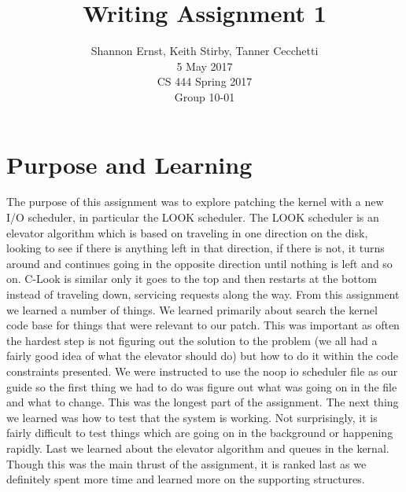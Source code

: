 \documentclass[letterpaper,10pt,serif,draftclsnofoot,onecolumn,compsoc,titlepage]{IEEEtran}
\title{Writing Assignment 1}
\author{Shannon Ernst, Keith Stirby, Tanner Cecchetti\\ 5 May 2017 \\ CS 444 Spring 2017 \\ Group 10-01}
\begin{document}
\maketitle
\begin{abstract}
\end{abstract}
\newpage
\tableofcontents
\newpage
\section{Purpose and Learning}
The purpose of this assignment was to explore patching the kernel with a
new I/O scheduler, in particular the LOOK scheduler. The LOOK scheduler is
an elevator algorithm which is based on traveling in one direction on the
disk, looking to see if there is anything left in that direction, if there
is not, it turns around and continues going in the opposite direction
until nothing is left and so on. C-Look is similar only it goes to the
top and then restarts at the bottom instead of traveling down, servicing
requests along the way. From this assignment we learned a number of things.
We learned primarily about search the kernel code base for things that
were relevant to our patch. This was important as often the hardest step
is not figuring out the solution to the problem (we all had a fairly good
idea of what the elevator should do) but how to do it within the code
constraints presented. We were instructed to use the noop io scheduler file
as our guide so the first thing we had to do was figure out what was going
on in the file and what to change. This was the longest part of the
assignment. The next thing we learned was how to test that the system is
working. Not surprisingly, it is fairly difficult to test things which
are going on in the background or happening rapidly. Last we learned about
the elevator algorithm and queues in the kernal. Though this was the main
thrust of the assignment, it is ranked last as we definitely spent more
time and learned more on the supporting structures.
\end{document}
